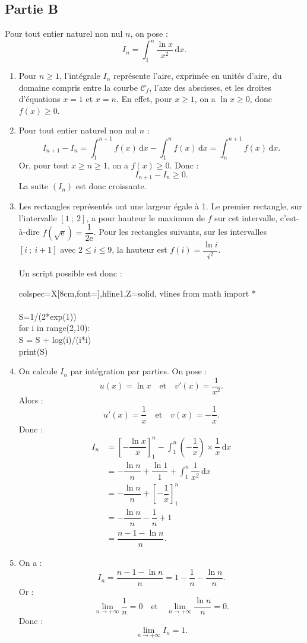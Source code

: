 \documentclass[10pt]{article}
\providecommand{\e}{{\mathrm{e}}}
\renewcommand{\d}{{\mathrm{d}}}
\begin{document}
\subsection*{Partie B}

Pour tout entier naturel non nul $n$, on pose :
\[
I_n=\int_1^n\dfrac{\ln x}{x^2}\,\d x.
\]

\begin{enumerate}
	\item Pour $n\geqslant 1$, l'intégrale $I_n$ représente l'aire, exprimée en unités d'aire, du domaine compris entre la courbe $\mathcal C_f$, l'axe des abscisses, et les droites d'équations $x=1$ et $x=n$.
	En effet, pour $x\geqslant 1$, on a $\ln x\geqslant 0$, donc $f(x)\geqslant 0$.

	\item Pour tout entier naturel non nul $n$ :
	\[
	I_{n+1}-I_n=\int_1^{n+1}f(x)\,\d x-\int_1^n f(x)\,\d x
	=\int_n^{n+1} f(x)\,\d x.
	\]
	Or, pour tout $x\geqslant n\geqslant 1$, on a $f(x)\geqslant 0$.
	Donc :
	\[
	I_{n+1}-I_n\geqslant 0.
	\]
	La suite $(I_n)$ est donc croissante.

	\item Les rectangles représentés ont une largeur égale à 1.
	Le premier rectangle, sur l'intervalle $[1~;~2]$, a pour hauteur le maximum de $f$ sur cet intervalle, c'est-à-dire $f(\sqrt\e)=\dfrac{1}{2\e}$.
	Pour les rectangles suivants, sur les intervalles $[i~;~i+1]$ avec $2\leqslant i\leqslant 9$, la hauteur est $f(i)=\dfrac{\ln i}{i^2}$.

	Un script possible est donc :

	\begin{center}
	\begin{tblr}{colspec={X[8cm,font=\ttfamily]},hline{1,Z}={solid}, vlines}
from math import *\\
\\
S=1/(2*exp(1))\\
for i in range(2,10):\\
\quad S = S + log(i)/(i*i)\\
print(S)
	\end{tblr}
	\end{center}

	\item On calcule $I_n$ par intégration par parties.
	On pose :
	\[
	u(x)=\ln x
	\quad\text{et}\quad
	v'(x)=\dfrac1{x^2}.
	\]
	Alors :
	\[
	u'(x)=\dfrac1x
	\quad\text{et}\quad
	v(x)=-\dfrac1x.
	\]
	Donc :
	\[
	\begin{aligned}
	I_n
	&=\left[-\dfrac{\ln x}{x}\right]_1^n-\int_1^n\left(-\dfrac1x\right)\times\dfrac1x\,\d x\\
	&=-\dfrac{\ln n}{n}+\dfrac{\ln 1}{1}+\int_1^n\dfrac1{x^2}\,\d x\\
	&=-\dfrac{\ln n}{n}+\left[-\dfrac1x\right]_1^n\\
	&=-\dfrac{\ln n}{n}-\dfrac1n+1\\
	&=\dfrac{n-1-\ln n}{n}.
	\end{aligned}
	\]

	\item On a :
	\[
	I_n=\dfrac{n-1-\ln n}{n}=1-\dfrac1n-\dfrac{\ln n}{n}.
	\]
	Or :
	\[
	\lim\limits_{n\to +\infty}\dfrac1n=0
	\quad\text{et}\quad
	\lim\limits_{n\to +\infty}\dfrac{\ln n}{n}=0.
	\]
	Donc :
	\[
	\lim\limits_{n\to +\infty} I_n=1.
	\]
\end{enumerate}
\end{document}
